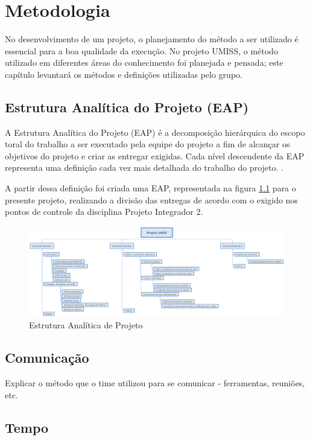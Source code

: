 \chapter{Metodologia}

No desenvolvimento de um projeto, o planejamento do método a ser utilizado
é essencial para a boa qualidade da execução. No projeto UMISS, o método
utilizado em diferentes áreas do conhecimento foi planejada e pensada;
este capítulo levantará os métodos e definições utilizadas pelo grupo.

\section{Estrutura Analítica do Projeto (EAP)}
A Estrutura Analítica do Projeto (EAP) é a decomposição hierárquica do escopo 
toral do trabalho a ser executado pela equipe do projeto a fim de alcançar
os objetivos do projeto e criar as entregar exigidas. Cada nível descendente 
da EAP representa uma definição cada vez mais detalhada do trabalho do 
projeto. \cite{pmbok}.

A partir dessa definição foi criada uma EAP, representada na figura \ref{fig:eap}
para o presente projeto, realizando 
a divisão das entregas de acordo com o exigido nos pontos de controle da 
disciplina Projeto Integrador 2.

\begin{figure}[H]
  \centering
    \includegraphics[width=450px]{figuras/eap.eps}
  \caption{Estrutura Analítica de Projeto}
  \label{fig:eap}
\end{figure}

\section{Comunicação}

Explicar o método que o time utilizou para se comunicar - ferramentas, reuniões, etc.

\section{Tempo}

